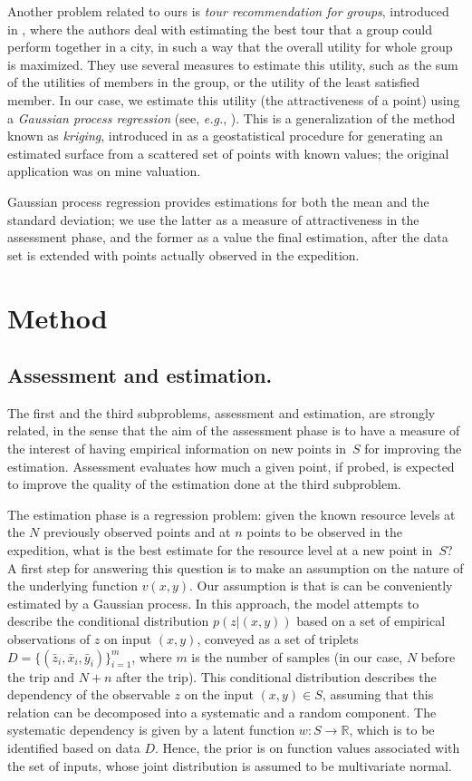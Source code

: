 \documentclass[smallextended]{svjour3}
\newcommand{\eg}{\emph{e.g.}}
\newcommand{\dx}{{\bar{x}}}	%
\newcommand{\dy}{{\bar{y}}}
\newcommand{\dz}{{\bar{z}}}
\begin{document}
Another problem related to ours is \emph{tour recommendation for groups}, introduced in \citet{Anagnostopoulos2017}, where the authors deal with estimating the best tour that a group could perform together in a city, in such a way that the overall utility for whole group is maximized.  They use several measures to estimate this utility, such as the sum of the utilities of members in the group, or the utility of the least satisfied member.  In our case, we estimate this utility (the attractiveness of a point) using a \emph{Gaussian process regression} (see, \eg, \citet{Rasmussen2005}).  This is a generalization of the method known as \emph{kriging}, introduced in \citet{Krige1951} as a geostatistical procedure for generating an estimated surface from a scattered set of points with known values; the original application was on mine valuation.

Gaussian process regression provides estimations for both the mean and the standard deviation; we use the latter as a measure of attractiveness in the assessment phase, and the former as a value the final estimation, after the data set is extended with points actually observed in the expedition.

\section{Method}
\label{sec:method}

\subsection{Assessment and estimation.} The first and the third subproblems, assessment and estimation, are strongly related, in the sense that the aim of the assessment phase is to have a measure of the interest of having empirical information on new points in~$S$ for improving the estimation.  Assessment evaluates how much a given point, if probed, is expected to improve the quality of the estimation done at the third subproblem.

The estimation phase is a regression problem: given the known resource levels at the $N$ previously observed points and at $n$ points to be observed in the expedition, what is the best estimate for the resource level at a new point in~$S$?  A first step for answering this question is to make an assumption on the nature of the underlying function $v(x,y)$.  Our assumption is that is can be conveniently estimated by a Gaussian process.  In this approach, the model attempts to describe the conditional distribution $p(z|(x,y))$ based on a set of empirical observations of $z$ on input $(x,y)$, conveyed as a set of triplets $D = \{(\dz_i,\dx_i,\dy_i)\}_{i=1}^{m}$, where $m$ is the number of samples (in our case, $N$ before the trip and $N+n$ after the trip).   This conditional distribution describes the dependency of the observable $z$ on the input $(x,y) \in S$, assuming that this relation can be decomposed into a systematic and a random component.  The systematic dependency is given by a latent function $w : S \to \mathbb{R}$, which is to be identified based on data $D$.  Hence, the prior is on function values associated with the set of inputs, whose joint distribution is assumed to be multivariate normal.
\end{document}

